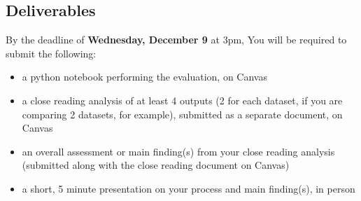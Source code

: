 \documentclass[12pt]{article}
\begin{document}
\subsection*{Deliverables}
\label{sec:orgb84a760}

By the deadline of \textbf{\textbf{Wednesday, December 9}} at 3pm, You will be
required to submit the following:
\begin{itemize}
\item a python notebook performing the evaluation, on Canvas
\item a close reading analysis of at least 4 outputs (2 for each dataset,
if you are comparing 2 datasets, for example), submitted as a
separate document, on Canvas
\item an overall assessment or main finding(s) from your close reading
analysis (submitted along with the close reading document on Canvas)
\item a short, 5 minute presentation on your process and main finding(s),
in person
\end{itemize}
\end{document}
